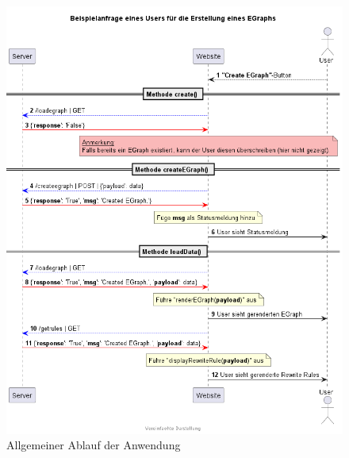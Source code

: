 \begin{figure}[H]
  \includegraphics[width=\textwidth]{../fig/query.png}
  \caption{Allgemeiner Ablauf der Anwendung}
  \label{fig:ablauf}
\end{figure}